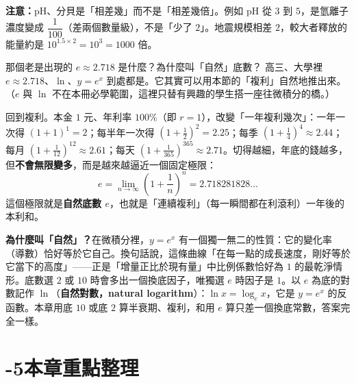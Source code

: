 \documentclass[11pt]{article}
\begin{document}
\textbf{注意：}pH、分貝是「相差幾」而不是「相差幾倍」。例如 pH 從 $3$ 到 $5$，是氫離子濃度變成 $\dfrac{1}{100}$（差兩個數量級），不是「少了 $2$」。地震規模相差 $2$，較大者釋放的能量約是 $10^{1.5\times2}=10^{3}=1000$ 倍。

\begin{延伸框}{那個老是出現的 $e\approx2.718$ 是什麼？為什麼叫「自然」底數？}
高三、大學裡 $e\approx2.718$、$\ln$、$y=e^{x}$ 到處都是。它其實可以用本節的「複利」自然地推出來。（$e$ 與 $\ln$ 不在本冊必學範圍，這裡只替有興趣的學生搭一座往微積分的橋。）

回到複利。本金 $1$ 元、年利率 $100\%$（即 $r=1$），改變「一年複利幾次」：一年一次得 $(1+1)^1=2$；每半年一次得 $\left(1+\tfrac12\right)^2=2.25$；每季 $\left(1+\tfrac14\right)^4\approx2.44$；每月 $\left(1+\tfrac1{12}\right)^{12}\approx2.61$；每天 $\left(1+\tfrac1{365}\right)^{365}\approx2.71$。切得越細，年底的錢越多，但\textbf{不會無限變多}，而是越來越逼近一個固定極限：
$$e=\lim_{n\to\infty}\left(1+\frac1n\right)^{n}=2.718281828\ldots$$
這個極限就是\textbf{自然底數 $e$}，也就是「連續複利」（每一瞬間都在利滾利）一年後的本利和。

\textbf{為什麼叫「自然」？}在微積分裡，$y=e^{x}$ 有一個獨一無二的性質：它的變化率（導數）恰好等於它自己。換句話說，這條曲線「在每一點的成長速度，剛好等於它當下的高度」——正是「增量正比於現有量」中比例係數恰好為 $1$ 的最乾淨情形。底數選 $2$ 或 $10$ 時會多出一個換底因子，唯獨選 $e$ 時因子是 $1$。以 $e$ 為底的對數記作 $\ln$（\textbf{自然對數，natural logarithm}）：$\ln x=\log_e x$，它是 $y=e^x$ 的反函數。本章用底 $10$ 或底 $2$ 算半衰期、複利，和用 $e$ 算只差一個換底常數，答案完全一樣。
\end{延伸框}

\section*{-5\quad 本章重點整理}
\end{document}
